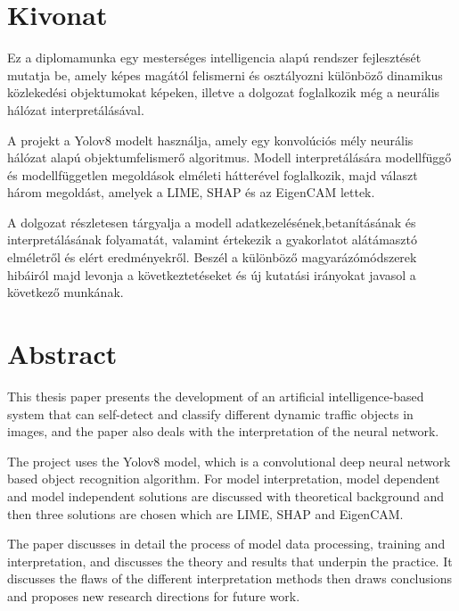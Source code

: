 \setcounter{page}{1}

\selecthungarian

\section*{Kivonat}

Ez a diplomamunka egy mesterséges intelligencia alapú rendszer fejlesztését mutatja be, amely képes magától felismerni és osztályozni különböző dinamikus közlekedési objektumokat képeken, illetve a dolgozat foglalkozik még a neurális hálózat interpretálásával.

A projekt a Yolov8 modelt használja, amely egy konvolúciós mély neurális hálózat alapú objektumfelismerő algoritmus.
Modell interpretálására modellfüggő és modellfüggetlen megoldások elméleti hátterével foglalkozik, majd választ három megoldást, amelyek a LIME, SHAP és az EigenCAM lettek.

A dolgozat részletesen tárgyalja a modell adatkezelésének,betanításának és interpretálásának folyamatát, valamint értekezik a gyakorlatot alátámasztó elméletről és elért eredményekről. Beszél a különböző magyarázómódszerek hibáiról
majd levonja a következtetéseket és új kutatási irányokat javasol a következő munkának.

\vfill
\clearpage
\selectenglish
\section*{Abstract}

This thesis paper presents the development of an artificial intelligence-based system that can self-detect and classify different dynamic traffic objects in images, and the paper also deals with the interpretation of the neural network.

The project uses the Yolov8 model, which is a convolutional deep neural network based object recognition algorithm.
For model interpretation, model dependent and model independent solutions are discussed with theoretical background and then three solutions are chosen which are LIME, SHAP and EigenCAM.

The paper discusses in detail the process of model data processing, training and interpretation, and discusses the theory and results that underpin the practice. It discusses the flaws of the different interpretation methods
then draws conclusions and proposes new research directions for future work.

\vfill
\cleardoublepage

\selectthesislanguage

\setcounter{romanPage}{\value{page}}
